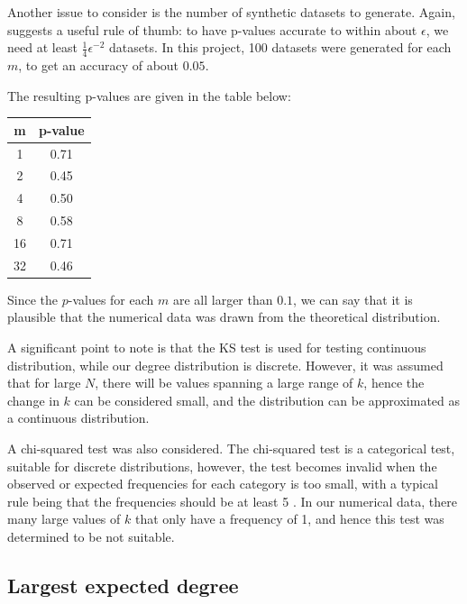 Another issue to consider is the number of synthetic datasets to generate. Again, \citet{Clauset2009} suggests a useful rule of thumb: to have p-values accurate to within about $\epsilon$, we need at least $\frac{1}{4}\epsilon^{-2}$ datasets. In this project, 100 datasets were generated for each $m$, to get an accuracy of about $0.05$. 

The resulting p-values are given in the table below:
\begin{center}
\begin{tabular}{ c | c }
 m &  p-value\\ 
 \hline
 1 & 0.71 \\  
 2 & 0.45 \\
 4 & 0.50 \\
 8 & 0.58 \\
 16 & 0.71 \\
 32 & 0.46 \\  
\end{tabular}
\label{table:ks-test-all}
\end{center}

Since the $p$-values for each $m$ are all larger than $0.1$, we can say that it is plausible that the numerical data was drawn from the theoretical distribution. 

A significant point to note is that the KS test is used for testing continuous distribution, while our degree distribution is discrete. However, it was assumed that for large $N$, there will be values spanning a large range of $k$, hence the change in $k$ can be considered small, and the distribution can be approximated as a continuous distribution. 

A chi-squared test was also considered. The chi-squared test is a categorical test, suitable for discrete distributions, however, the test becomes invalid when the observed or expected frequencies for each category is too small, with a typical rule being that the frequencies should be at least 5 \citep{Lawrence1997}. In our numerical data, there many large values of $k$ that only have a frequency of 1, and hence this test was determined to be not suitable. 

\subsection{Largest expected degree}
